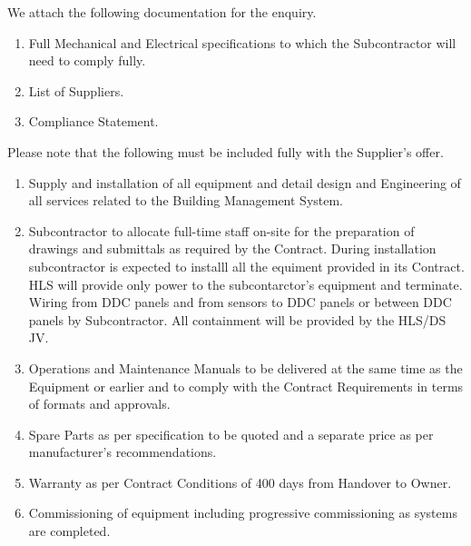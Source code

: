 \documentclass[a4paper,12pt,oneside]{article}
\begin{document}
\begin{mcdletter}

We attach the following documentation for the enquiry.

\begin{enumerate}    

\item Full Mechanical and Electrical specifications to which the Subcontractor will need to comply fully.
\item List of Suppliers.
\item Compliance Statement.
\end{enumerate}

Please note that the following must be included fully with the Supplier's offer.

\begin{enumerate}
\item Supply and installation of all equipment and detail design and Engineering of all services related to the Building Management System.

\item Subcontractor to allocate full-time staff on-site for the preparation of drawings and submittals as required by the Contract. During installation subcontractor is expected to installl all the equiment provided in its Contract. HLS will provide only power to the subcontarctor's equipment and terminate. Wiring from DDC panels and from sensors to DDC panels or between DDC panels by Subcontractor. All containment will be provided by the HLS/DS JV.

\item Operations and Maintenance Manuals to be delivered at the same time as the Equipment or earlier and to comply with the Contract Requirements in terms of formats and approvals.

\item Spare Parts as per specification to be quoted and a separate price as per manufacturer's recommendations.

\item Warranty as per Contract Conditions of 400 days from Handover to Owner.

\item Commissioning of equipment including progressive commissioning as systems are completed.
\end{enumerate}


\end{mcdletter}
\end{document}
